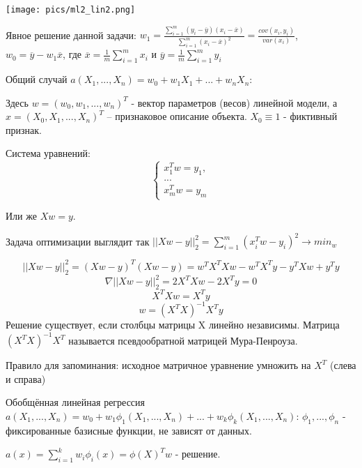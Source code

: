 \texttt{[image: pics/ml2\_lin2.png]}

Явное решение данной задачи:
$w_1 = \frac{\sum\limits_{i=1}^m (y_i - \overline y)(x_i - \overline x)}{\sum\limits_{i=1}^m (x_i - \overline x)^2} = \frac{cov(x_i, y_i)}{var(x_i)}$, $w_0 = \overline y - w_1 \overline x$, где $\overline x = \frac{1}{m} \sum\limits_{i=1}^m x_i$ и $\overline y = \frac{1}{m} \sum\limits_{i=1}^m y_i$

Общий случай $a(X_1, ..., X_n) = w_0 + w_1X_1 + ... + w_nX_n$:

Здесь $w = (w_0, w_1, ..., w_n)^T$ - вектор параметров (весов) линейной модели, а $x = (X_0, X_1, ..., X_n)^T$ – признаковое описание объекта. $X_0 \equiv 1$ - фиктивный признак.

Система уравнений:
\begin{equation*}
 \begin{cases}
   x_1^Tw = y_1, 
   \\
   ...
   \\
   x_m^Tw = y_m
 \end{cases}
\end{equation*}

Или же $Xw = y$.

Задача оптимизации выглядит так $|| Xw - y ||_2^2 = \sum\limits_{i=1}^m (x_i^Tw - y_i)^2 \rightarrow min_w$

\begin{equation}
|| Xw - y ||_2^2 = (Xw - y)^T(Xw - y)= w^TX^TXw - w^TX^Ty - y^TXw +y^Ty
\end{equation}
\begin{equation}
\nabla || Xw - y ||_2^2 = 2X^TXw - 2X^Ty = 0
\end{equation}
\begin{equation}
 X^TXw = X^Ty
\end{equation}
\begin{equation}
 w = (X^TX)^{-1}X^Ty
\end{equation}
Решение существует, если столбцы матрицы X линейно независимы.
Матрица $(X^TX)^{-1}X^T$ называется псевдообратной матрицей Мура-Пенроуза.

Правило для запоминания: исходное матричное уравнение умножить на $X^T$ (слева и справа)

Обобщённая линейная регрессия $a(X_1, ..., X_n) = w_0 + w_1\phi_1(X_1, ..., X_n) + ... + w_k\phi_k(X_1, ..., X_n)$:
$\phi_1, ..., \phi_n$ - фиксированные базисные функции, не зависят от данных.

$a(x) = \sum\limits_{i=1}^k w_i\phi_i(x) = \phi(X)^Tw$ - решение.

